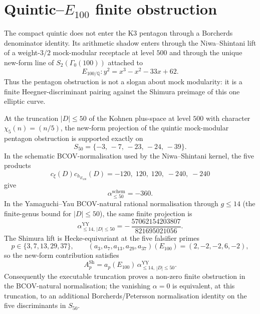 \section{Quintic--\texorpdfstring{$E_{100}$}{E100} finite obstruction}
\label{sec:quintic-E100-finite-obstruction}

The compact quintic does not enter the K3 pentagon through a Borcherds
denominator identity. Its arithmetic shadow enters through the
Niwa--Shintani lift of a weight-$3/2$ mock-modular receptacle at level
$500$ and through the unique new-form line of
$S_2(\Gamma_0(100))$ attached to
\[
 E_{100/\mathbb{Q}}\colon y^2 = x^3 - x^2 - 33x + 62 .
\]
Thus the pentagon obstruction is not a slogan about mock modularity: it is
a finite Heegner-discriminant pairing against the Shimura preimage of this
one elliptic curve.

\begin{proposition}
\label{prop:quintic-E100-finite-obstruction}
At the truncation $|D|\le 50$ of the Kohnen plus-space at level $500$
with character $\chi_5(n)=(n/5)$, the new-form projection of the
quintic mock-modular pentagon obstruction is supported exactly on
\[
 S_{50}=\{-3,\,-7,\,-23,\,-24,\,-39\}.
\]
In the schematic BCOV-normalisation used by the Niwa--Shintani kernel,
the five products
\[
 c_{\xi}(D)c_{h_{E_{100}}}(D)
 =
 -120,\;120,\;120,\;-240,\;-240
\]
give
\[
 \alpha^{\mathrm{schem}}_{\le 50}=-360.
\]
In the Yamaguchi--Yau BCOV-natural rational normalisation through
$g\le 14$ (the finite-genus bound for $|D|\le 50$), the same finite
projection is
\[
 \alpha^{\mathrm{YY}}_{\le 14,\, |D|\le 50}
 =
 -\,\frac{57062154203807}{821695021056}.
\]
The Shimura lift is Hecke-equivariant at the five falsifier primes
\[
 p\in \{3,7,13,29,37\},\qquad
 (a_3,a_7,a_{13},a_{29},a_{37})(E_{100})
 =(2,-2,-2,6,-2),
\]
so the new-form contribution satisfies
\[
 A^{\mathrm{Sh}}_p
 =
 a_p(E_{100})\,
 \alpha^{\mathrm{YY}}_{\le 14,\, |D|\le 50}.
\]
Consequently the executable truncation proves a non-zero finite
obstruction in the BCOV-natural normalisation; the vanishing
$\alpha=0$ is equivalent, at this truncation, to an additional
Borcherds/Petersson normalisation identity on the five discriminants in
$S_{50}$.
\end{proposition}

